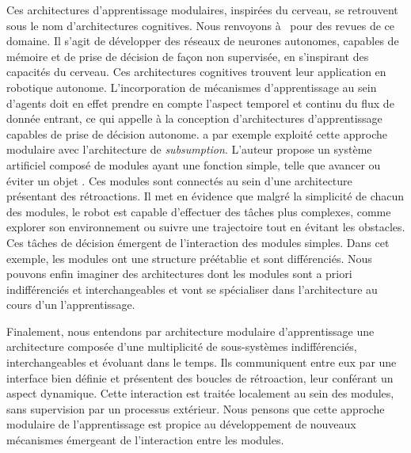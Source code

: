 Ces architectures d'apprentissage modulaires, inspirées du cerveau, se retrouvent sous le nom d'architectures cognitives. Nous renvoyons à~\cite{Thrisson2012CognitiveAA,Kotseruba201840YO} pour des revues de ce domaine. Il s'agit de développer des réseaux de neurones autonomes, capables de mémoire et de prise de décision de façon non supervisée, en s'inspirant des capacités du cerveau.
Ces architectures cognitives trouvent leur application en robotique autonome.
L'incorporation de mécanismes d'apprentissage au sein d'agents doit en effet prendre en compte l'aspect temporel et continu du flux de donnée entrant, ce qui appelle à la conception d'architectures d'apprentissage capables de prise de décision autonome.
\cite{brooks_sumsumption_85} a par exemple exploité cette approche modulaire avec l'architecture de \emph{subsumption}. L'auteur propose un système artificiel composé de modules ayant une fonction simple, telle que \og avancer \fg{} ou \og éviter un objet \fg{}. Ces modules sont connectés au sein d'une architecture présentant des rétroactions. Il met en évidence que malgré la simplicité de chacun des modules, le robot est capable d'effectuer des tâches plus complexes, comme explorer son environnement ou suivre une trajectoire tout en évitant les obstacles. Ces tâches de décision émergent de l'interaction des modules simples.
Dans cet exemple, les modules ont une structure préétablie et sont différenciés. Nous pouvons enfin imaginer des architectures dont les modules sont a priori indifférenciés et interchangeables et vont se spécialiser dans l'architecture au cours d'un l'apprentissage. 


Finalement, nous entendons par architecture modulaire d'apprentissage une architecture composée d'une multiplicité de sous-systèmes indifférenciés, interchangeables et évoluant dans le temps.
Ils communiquent entre eux par une interface bien définie et présentent des boucles de rétroaction, leur conférant un aspect dynamique. Cette interaction est traitée localement au sein des modules, sans supervision par un processus extérieur.
Nous pensons que cette approche modulaire de l'apprentissage est propice au développement de nouveaux mécanismes émergeant de l'interaction entre les modules.


